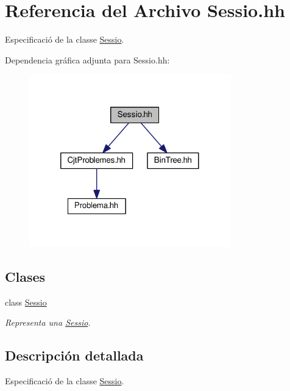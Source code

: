 \hypertarget{_sessio_8hh}{}\section{Referencia del Archivo Sessio.\+hh}
\label{_sessio_8hh}


Especificació de la classe \mbox{\hyperlink{class_sessio}{Sessio}}.  


Dependencia gráfica adjunta para Sessio.\+hh\+:\nopagebreak
\begin{figure}[H]
\begin{center}
\leavevmode
\includegraphics[width=248pt]{_sessio_8hh__incl}
\end{center}
\end{figure}
\subsection*{Clases}
\begin{DoxyCompactItemize}
\item 
class \mbox{\hyperlink{class_sessio}{Sessio}}
\begin{DoxyCompactList}\small\item\em Representa una \mbox{\hyperlink{class_sessio}{Sessio}}. \end{DoxyCompactList}\end{DoxyCompactItemize}


\subsection{Descripción detallada}
Especificació de la classe \mbox{\hyperlink{class_sessio}{Sessio}}. 

